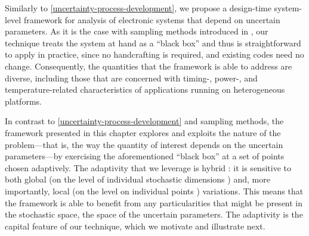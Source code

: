 Similarly to \cref{uncertainty-process-development}, we propose a design-time
system-level framework for analysis of electronic systems that depend on
uncertain parameters. As it is the case with sampling methods introduced in
, our technique treats the system at hand as a ``black box'' and thus
is straightforward to apply in practice, since no handcrafting is required, and
existing codes need no change. Consequently, the quantities that the framework
is able to address are diverse, including those that are concerned with timing-,
power-, and temperature-related characteristics of applications running on
heterogeneous platforms.

In contrast to \cref{uncertainty-process-development} and sampling methods, the
framework presented in this chapter explores and exploits the nature of the
problem---that is, the way the quantity of interest depends on the uncertain
parameters---by exercising the aforementioned ``black box'' at a set of points
chosen adaptively. The adaptivity that we leverage is hybrid \cite{jakeman2012}:
it is sensitive to both global (on the level of individual stochastic dimensions
\cite{klimke2006}) and, more importantly, local (on the level on individual
points \cite{ma2009}) variations. This means that the framework is able to
benefit from any particularities that might be present in the stochastic space,
the space of the uncertain parameters. The adaptivity is the capital feature of
our technique, which we motivate and illustrate next.

